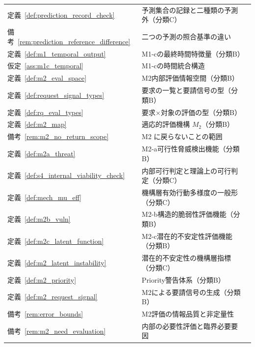 \begin{longtable}{p{2.4cm} p{10.4cm} r}
定義~\ref{def:prediction_record_check} & 予測集合の記録と二種類の予測外（分類C） & \pageref{def:prediction_record_check} \\
備考~\ref{rem:prediction_reference_difference} & 二つの予測の照合基準の違い & \pageref{rem:prediction_reference_difference} \\
定義~\ref{def:m1_temporal_output} & M1-cの最終時間特徴量（分類B） & \pageref{def:m1_temporal_output} \\
仮定~\ref{ass:m1c_temporal} & M1-cの時間統合構造 & \pageref{ass:m1c_temporal} \\
定義~\ref{def:m2_eval_space} & M2内部評価情報空間（分類B） & \pageref{def:m2_eval_space} \\
定義~\ref{def:request_signal_types} & 要求の一覧と要請信号の型（分類B） & \pageref{def:request_signal_types} \\
定義~\ref{def:rq_eval_types} & 要求×対象の評価の型（分類B） & \pageref{def:rq_eval_types} \\
定義~\ref{def:m2_map} & 適応的評価機構 $M_2$（分類B） & \pageref{def:m2_map} \\
備考~\ref{rem:m2_no_return_scope} & M2 に戻らないことの範囲 & \pageref{rem:m2_no_return_scope} \\
定義~\ref{def:m2a_threat} & M2-a可行性脅威検出機能（分類B） & \pageref{def:m2a_threat} \\
定義~\ref{def:s4_internal_viability_check} & 内部可行判定と理論上の可行判定（分類C） & \pageref{def:s4_internal_viability_check} \\
定義~\ref{def:mech_mu_eff} & 機構層有効行動多様度の一般形（分類C） & \pageref{def:mech_mu_eff} \\
定義~\ref{def:m2b_vuln} & M2-b構造的脆弱性評価機能（分類B） & \pageref{def:m2b_vuln} \\
定義~\ref{def:m2c_latent_function} & M2-c潜在的不安定性評価機能（分類B） & \pageref{def:m2c_latent_function} \\
定義~\ref{def:m2_latent_instability} & 潜在的不安定性の機構層指標（分類C） & \pageref{def:m2_latent_instability} \\
定義~\ref{def:m2_priority} & Priority警告体系（分類B） & \pageref{def:m2_priority} \\
定義~\ref{def:m2_request_signal} & M2による要請信号の生成（分類B） & \pageref{def:m2_request_signal} \\
備考~\ref{rem:error_bounds} & M2評価の情報品質と非定量性 & \pageref{rem:error_bounds} \\
備考~\ref{rem:m2_need_evaluation} & 内部の必要性評価と臨界必要要因 & \pageref{rem:m2_need_evaluation} \\

\end{longtable}
